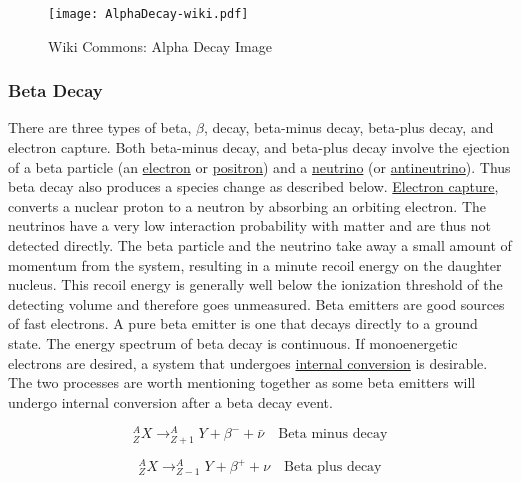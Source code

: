 \documentclass[12pt]{article}
\begin{document}
\begin{doublespacing}
\begin{figure}[!h]
    \centering
    \texttt{[image: AlphaDecay-wiki.pdf]}
    \caption{Wiki Commons: Alpha Decay Image} %
    \label{fig:alphadecay}
\end{figure}

\subsubsection{Beta Decay}
There are three types of beta, $\beta$, decay, beta-minus decay, beta-plus decay, and electron capture. Both beta-minus decay, and beta-plus decay involve the ejection of a beta particle (an \href{http://en.wikipedia.org/wiki/Electron}{electron} or \href{http://en.wikipedia.org/wiki/Positron}{positron}) and a \href{http://en.wikipedia.org/wiki/Neutrino}{neutrino} (or \href{http://en.wikipedia.org/wiki/Antineutrino#Antineutrinos}{antineutrino}). Thus beta decay also produces a species change as described below. \href{https://en.wikipedia.org/wiki/Electron_capture}{Electron capture}, converts a nuclear proton to a neutron by absorbing an orbiting electron.
The neutrinos have a very low interaction probability with matter and are thus not detected directly. The beta particle and the neutrino take away a small amount of momentum from the system, resulting in a minute recoil energy on the daughter nucleus. This recoil energy is generally well below the ionization threshold of the detecting volume and therefore goes unmeasured.
Beta emitters are good sources of fast electrons. A pure beta emitter is one that decays directly to a ground state. The energy spectrum of beta decay is continuous. If monoenergetic electrons are desired, a system that undergoes \href{https://en.wikipedia.org/wiki/Internal_conversion}{internal conversion} is desirable. The two processes are worth mentioning together as some beta emitters will undergo internal conversion after a beta decay event.

\begin{equation} \label{betaMinusDecayEqn}
^A_Z X \rightarrow ^{A}_{Z+1}Y + \beta^{-} + \bar{\nu} \quad \mbox{Beta minus decay}
\end{equation}

\begin{equation} \label{betaPlusDecayEqn}
^A_Z X \rightarrow ^{A}_{Z-1}Y + \beta^{+} + \nu \quad \mbox{Beta plus decay}
\end{equation}


\end{doublespacing}
\end{document}
